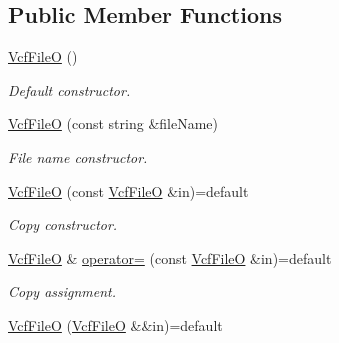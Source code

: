 \subsection*{Public Member Functions}
\begin{DoxyCompactItemize}
\item 
\mbox{\label{classsamp_files_1_1_vcf_file_o_a60c2250796e762eea3206715a0e0dcae}} 
\hyperlink{classsamp_files_1_1_vcf_file_o_a60c2250796e762eea3206715a0e0dcae}{Vcf\+FileO} ()
\begin{DoxyCompactList}\small\item\em Default constructor. \end{DoxyCompactList}\item 
\hyperlink{classsamp_files_1_1_vcf_file_o_adb76e03e9e9bbab5cee0f2c6fe2385f5}{Vcf\+FileO} (const string \&file\+Name)
\begin{DoxyCompactList}\small\item\em File name constructor. \end{DoxyCompactList}\item 
\mbox{\label{classsamp_files_1_1_vcf_file_o_a1ab16f942445fc31efbfbdb02eb3f0be}} 
\hyperlink{classsamp_files_1_1_vcf_file_o_a1ab16f942445fc31efbfbdb02eb3f0be}{Vcf\+FileO} (const \hyperlink{classsamp_files_1_1_vcf_file_o}{Vcf\+FileO} \&in)=default
\begin{DoxyCompactList}\small\item\em Copy constructor. \end{DoxyCompactList}\item 
\mbox{\label{classsamp_files_1_1_vcf_file_o_a08c2eebf8030d78647e9773bcb8efb20}} 
\hyperlink{classsamp_files_1_1_vcf_file_o}{Vcf\+FileO} \& \hyperlink{classsamp_files_1_1_vcf_file_o_a08c2eebf8030d78647e9773bcb8efb20}{operator=} (const \hyperlink{classsamp_files_1_1_vcf_file_o}{Vcf\+FileO} \&in)=default
\begin{DoxyCompactList}\small\item\em Copy assignment. \end{DoxyCompactList}\item 
\mbox{\label{classsamp_files_1_1_vcf_file_o_a4b96f36f114d7eeb0939325ad4fcf9a7}} 
\hyperlink{classsamp_files_1_1_vcf_file_o_a4b96f36f114d7eeb0939325ad4fcf9a7}{Vcf\+FileO} (\hyperlink{classsamp_files_1_1_vcf_file_o}{Vcf\+FileO} \&\&in)=default

\end{DoxyCompactItemize}
